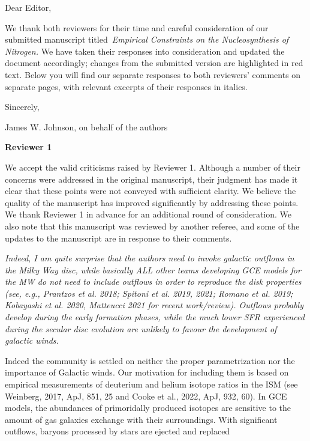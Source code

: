 \documentclass[12pt]{article}
\newcommand\doublebreak[0]{\par\null\par\noindent}
\begin{document}
\noindent
Dear Editor,
\par\null\par\noindent
We thank both reviewers for their time and careful consideration of our
submitted manuscript titled~\textit{Empirical Constraints on the
Nucleosynthesis of Nitrogen.}
We have taken their responses into consideration and updated the document
accordingly; changes from the submitted version are highlighted in red text.
Below you will find our separate responses to both reviewers' comments on
separate pages, with relevant excerpts of their responses in italics.
\doublebreak\null\doublebreak
Sincerely,
\doublebreak
James W. Johnson, on behalf of the authors
\newpage
\begin{center}
\textbf{Reviewer 1}
\makebox[\linewidth]{\rule{0.5\textwidth}{0.4pt}}
\end{center}
\par\noindent
We accept the valid criticisms raised by Reviewer 1.
Although a number of their concerns were addressed in the original manuscript,
their judgment has made it clear that these points were not conveyed with
sufficient clarity.
We believe the quality of the manuscript has improved significantly by
addressing these points.
We thank Reviewer 1 in advance for an additional round of consideration.
We also note that this manuscript was reviewed by another referee, and some of
the updates to the manuscript are in response to their comments.
\doublebreak
\textit{%
Indeed, I am quite surprise that the authors need to invoke galactic outflows
in the Milky Way disc, while basically ALL other teams developing GCE models
for the MW do not need to include outflows in order to reproduce the disk
properties (see, e.g., Prantzos et al. 2018; Spitoni et al. 2019, 2021; Romano
et al. 2019; Kobayashi et al. 2020, Matteucci 2021 for recent work/review).
Outflows probably develop during the early formation phases, while the much
lower SFR experienced during the secular disc evolution are unlikely to favour
the development of galactic winds.
}
\doublebreak
Indeed the community is settled on neither the proper parametrization nor the
importance of Galactic winds.
Our motivation for including them is based on empirical measurements of
deuterium and helium isotope ratios in the ISM (see Weinberg, 2017, ApJ, 851,
25 and Cooke et al., 2022, ApJ, 932, 60).
In GCE models, the abundances of primoridally produced isotopes are sensitive
to the amount of gas galaxies exchange with their surroundings.
With significant outflows, baryons processed by stars are ejected and replaced
\end{document}
